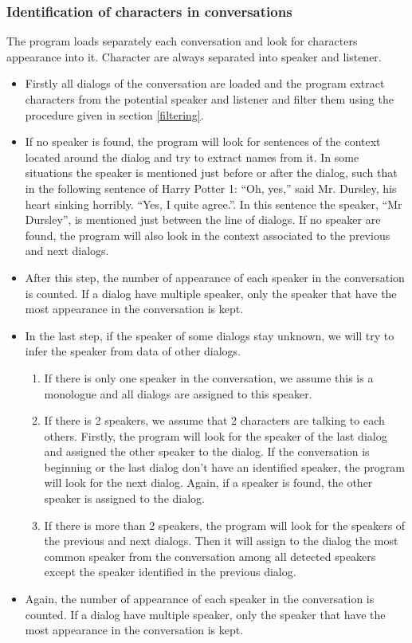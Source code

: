\documentclass[a4paper, 12pt]{report}
\begin{document}
\subsubsection{Identification of characters in conversations}
The program loads separately each conversation and look for characters appearance into it. Character are always separated into speaker and listener. \\
\begin{itemize}
\item Firstly all dialogs of the conversation are loaded and the program extract characters from the potential speaker and listener and filter them using the procedure given in section \ref{filtering}. 

\item If no speaker is found, the program will look for sentences of the context located around the dialog and try to extract names from it. In some situations the speaker is mentioned just before or after the dialog, such that in the following sentence of Harry Potter 1: “Oh, yes,” said Mr. Dursley, his heart sinking horribly. “Yes, I quite agree.”. In this sentence the speaker, ``Mr Dursley'', is mentioned just between the line of dialogs. If no speaker are found, the program will also look in the context associated to the previous and next dialogs.\\

\item After this step, the number of appearance of each speaker in the conversation is counted. If a dialog have multiple speaker, only the speaker that have the most appearance in the conversation is kept.

\item In the last step, if the speaker of some dialogs stay unknown, we will try to infer the speaker from data of other dialogs.
	\begin{enumerate}
	\item If there is only one speaker in the conversation, we assume this is a monologue and all dialogs are assigned to this speaker.
	\item If there is 2 speakers, we assume that 2 characters are talking to each others. Firstly, the program will look for the speaker of the last dialog and assigned the other speaker to the dialog. If the conversation is beginning or the last dialog don't have an identified speaker, the program will look for the next dialog. Again, if a speaker is found, the other speaker is assigned to the dialog.
	\item If there is more than 2 speakers, the program will look for the speakers of the previous and next dialogs. Then it will assign to the dialog the most common speaker from the conversation among all detected speakers except the speaker identified in the previous dialog.
	\end{enumerate}
\item Again, the number of appearance of each speaker in the conversation is counted. If a dialog have multiple speaker, only the speaker that have the most appearance in the conversation is kept.


\end{itemize}
\end{document}
